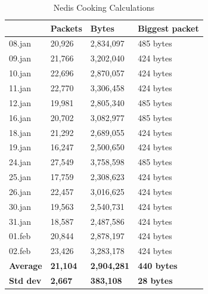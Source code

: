 \begin{table}[H]
\centering
\caption{Nedis Cooking Calculations}
\label{tab:NedisCookingCalculations}
\begin{tabular}{|l|l|l|l|}
\hline
                   & \textbf{Packets} & \textbf{Bytes}     & \textbf{Biggest packet} \\ \hline
08.jan             & 20,926           & 2,834,097          & 485 bytes               \\ \hline
09.jan             & 21,766           & 3,202,040          & 424 bytes               \\ \hline
10.jan             & 22,696           & 2,870,057          & 424 bytes               \\ \hline
11.jan             & 22,770           & 3,306,458          & 424 bytes               \\ \hline
12.jan             & 19,981           & 2,805,340          & 485 bytes               \\ \hline
16.jan             & 20,702           & 3,082,977          & 485 bytes               \\ \hline
18.jan             & 21,292           & 2,689,055          & 424 bytes               \\ \hline
19.jan             & 16,247           & 2,500,650          & 424 bytes               \\ \hline
24.jan             & 27,549           & 3,758,598          & 485 bytes               \\ \hline
25.jan             & 17,759           & 2,308,623          & 424 bytes               \\ \hline
26.jan             & 22,457           & 3,016,625          & 424 bytes               \\ \hline
30.jan             & 19,563           & 2,540,731          & 424 bytes               \\ \hline
31.jan             & 18,587           & 2,487,586          & 424 bytes               \\ \hline
01.feb             & 20,844           & 2,878,197          & 424 bytes               \\ \hline
02.feb             & 23,426           & 3,283,178          & 424 bytes               \\ \hline
\textbf{Average}   & \textbf{21,104}  & \textbf{2,904,281} & \textbf{440 bytes}      \\ \hline
\textbf{Std dev} & \textbf{2,667}   & \textbf{383,108}   & \textbf{28 bytes}         \\ \hline
\end{tabular}
\end{table}

